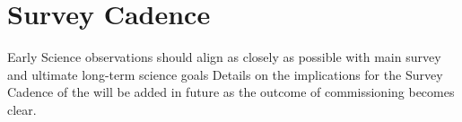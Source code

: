 \section{Survey Cadence}

Early Science observations should align as closely as possible with main survey and ultimate long-term science goals
Details on the implications for the Survey Cadence of the \esp will be added in future as the outcome of commissioning becomes clear.

